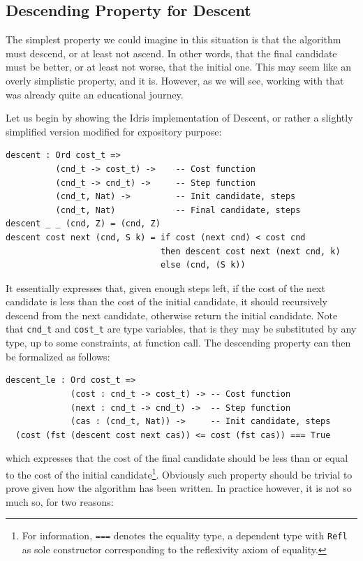 \documentclass[]{report}
\begin{document}
\subsection{Descending Property for Descent}
The simplest property we could imagine in this situation is that the
algorithm must descend, or at least not ascend.  In other words, that
the final candidate must be better, or at least not worse, that the
initial one.  This may seem like an overly simplistic property, and it
is.  However, as we will see, working with that was already quite an
educational journey.

Let us begin by showing the Idris implementation of Descent, or rather
a slightly simplified version modified for expository purpose:
\begin{verbatim}
descent : Ord cost_t =>
          (cnd_t -> cost_t) ->    -- Cost function
          (cnd_t -> cnd_t) ->     -- Step function
          (cnd_t, Nat) ->         -- Init candidate, steps
          (cnd_t, Nat)            -- Final candidate, steps
descent _ _ (cnd, Z) = (cnd, Z)
descent cost next (cnd, S k) = if cost (next cnd) < cost cnd
                               then descent cost next (next cnd, k)
                               else (cnd, (S k))
\end{verbatim}
It essentially expresses that, given enough steps left, if the cost of
the next candidate is less than the cost of the initial candidate, it
should recursively descend from the next candidate, otherwise return
the initial candidate.  Note that \texttt{cnd\_t} and \texttt{cost\_t}
are type variables, that is they may be substituted by any type, up to
some constraints, at function call.  The descending property can then
be formalized as follows:
\begin{verbatim}
descent_le : Ord cost_t =>
             (cost : cnd_t -> cost_t) -> -- Cost function
             (next : cnd_t -> cnd_t) ->  -- Step function
             (cas : (cnd_t, Nat)) ->     -- Init candidate, steps
  (cost (fst (descent cost next cas)) <= cost (fst cas)) === True
\end{verbatim}
which expresses that the cost of the final candidate should be less
than or equal to the cost of the initial candidate\footnote{For
  information, \texttt{===} denotes the equality type, a dependent
  type with \texttt{Refl} as sole constructor corresponding to the
  reflexivity axiom of equality.}.  Obviously such property should be
trivial to prove given how the algorithm has been written.  In
practice however, it is not so much so, for two reasons:
\end{document}
